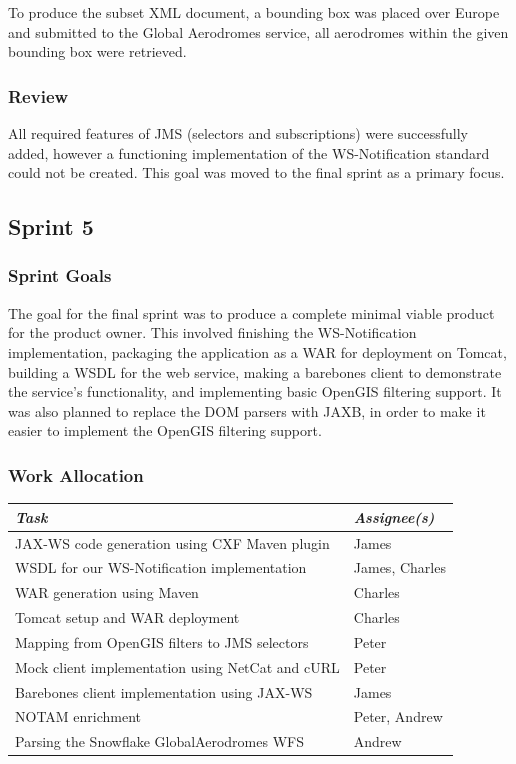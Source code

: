 \documentclass[a4paper, 12pt, twoside]{article}
\begin{document}
To produce the subset XML document, a bounding box was placed over Europe and submitted to the Global Aerodromes service, all aerodromes within the given bounding box were retrieved.

\subsubsection{Review}

All required features of JMS (selectors and subscriptions) were successfully added, however a functioning implementation of the WS-Notification standard could not be created. This goal was moved to the final sprint as a primary focus.

\subsection{Sprint 5}
\label{sec:impl_sprint_5}

\subsubsection{Sprint Goals}

The goal for the final sprint was to produce a complete minimal viable product for the product owner. This involved finishing the WS-Notification implementation, packaging the application as a WAR for deployment on Tomcat, building a WSDL for the web service, making a barebones client to demonstrate the service's functionality, and implementing basic OpenGIS filtering support. It was also planned to replace the DOM parsers with JAXB, in order to make it easier to implement the OpenGIS filtering support.

\subsubsection{Work Allocation}

\begin{tabular}{l|l}
  \emph{Task} & \emph{Assignee(s)} \\ \hline
  JAX-WS code generation using CXF Maven plugin & James \\
  WSDL for our WS-Notification implementation & James, Charles \\
  WAR generation using Maven & Charles \\
  Tomcat setup and WAR deployment & Charles \\
  Mapping from OpenGIS filters to JMS selectors & Peter \\
  Mock client implementation using NetCat and cURL & Peter \\
  Barebones client implementation using JAX-WS & James \\
  NOTAM enrichment & Peter, Andrew \\
  Parsing the Snowflake GlobalAerodromes WFS & Andrew \\
\end{tabular}
\end{document}
